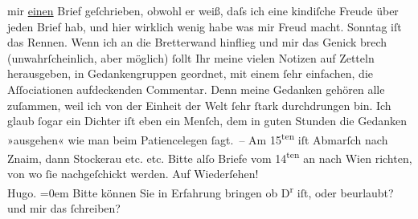 \begin{ledgroupsized}[t]{13cm}
               mir \uline{einen} Brief geſchrieben, obwohl er weiß, daſs ich
               eine kindiſche Freude über jeden Brief hab, und hier wirklich wenig habe was mir
               Freud macht. Sonntag iſt das Rennen. Wenn ich an die Bretterwand hinflieg und mir das
               Genick brech (unwahrſcheinlich, {\pb}aber möglich) ſollt Ihr meine vielen Notizen auf Zetteln herausgeben, in
               Gedankengruppen geordnet, mit einem ſehr einfachen, die Aſſociationen aufdeckenden
               Commentar. Denn meine Gedanken gehören alle zuſammen, weil ich von der Einheit der
               Welt ſehr ſtark durchdrungen bin. Ich glaub ſogar ein Dichter iſt eben ein Menſch,
               dem in guten Stunden die Gedanken »ausgehen« wie man beim Patiencelegen ſagt. – Am
                     15\textsuperscript{ten} iſt Abmarſch {\pb}nach Znaim, dann Stockerau etc. etc. Bitte alſo Briefe vom 14\textsuperscript{ten} an nach Wien richten, von wo ſie
               nachgeſchickt werden.\pend
           \pstart
           Auf Wiederſehen!{\\[\baselineskip]}\spacefill\mbox{Hugo.}\pend
           \leftskip=0em{}\pstart
           \noindent{}Bitte können Sie in Erfahrung bringen ob D\textsuperscript{r}{ }\label{K_L00471-1v}\label{K_L00471-1h} iſt, oder beurlaubt? und mir das ſchreiben? \pend
           
         
         \endnumbering{}\end{ledgroupsized}  \newcommand{\dateiname}{L00471}\newcommand{\titel}{Hugo von Hofmannsthal an Arthur Schnitzler, 9. 8. [1895]}\newcommand{\editorInnen}{Martin Anton Müller und Gerd-Hermann Susen}
      
